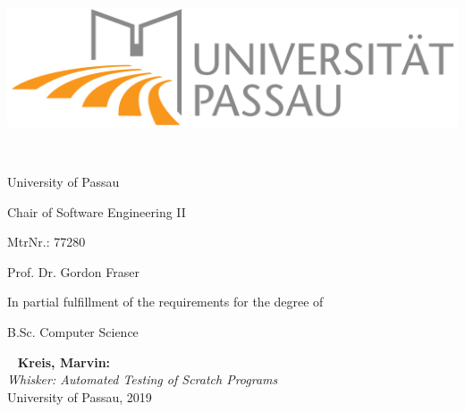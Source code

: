 \renewcommand*{\maketitle}{
\begin{titlepage}

    \centering

    \begin{minipage}[c]{0.45\textwidth}
        {\includegraphics[width=\textwidth]{media/uni-logo}\par}
    \end{minipage}
    \begin{minipage}[c]{0.05\textwidth}
        {~}
    \end{minipage}
    \begin{minipage}[c]{0.4\textwidth}
        {\flushleft\Large University of Passau \unskip\strut\par}
        {\flushleft\large Chair of Software Engineering II \unskip\strut\par}
    \end{minipage}

    \vspace{2cm}

    {\huge\bfseries \thetitle \unskip\strut\par}

    \vspace{2cm}

    {\Large \theauthor \unskip\strut\par}
    {\Large MtrNr.: 77280 \unskip\strut\par}

    \vspace{2cm}

    {\Large Prof. Dr. Gordon Fraser \unskip\strut\par}

    \vfill

    {\large In partial fulfillment of the requirements for the degree of \unskip\strut\par}
    {\large B.Sc. Computer Science \unskip\strut\par}

    \vfill

    {\large \thedate \par}

\end{titlepage}
}

\maketitle

\
\vfill
\noindent
\textbf{Kreis, Marvin:}\\
\textit{Whisker: Automated Testing of Scratch Programs}\\
University of Passau, 2019
